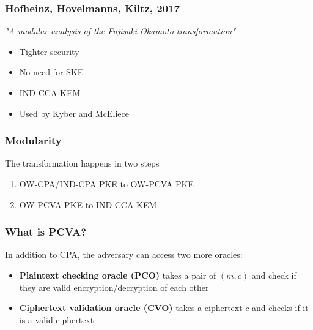 \documentclass{beamer}
\begin{document}
\begin{frame}
    \frametitle{Hofheinz, Hovelmanns, Kiltz, 2017}

    \textit{"A modular analysis of the Fujisaki-Okamoto transformation"}

    \begin{itemize}
        \item Tighter security
        \item No need for SKE
        \item IND-CCA KEM
        \item Used by Kyber and McEliece
    \end{itemize}

\end{frame}

\begin{frame}
    \frametitle{Modularity}

    The transformation happens in two steps

    \begin{enumerate}
        \item OW-CPA/IND-CPA PKE to OW-PCVA PKE
        \item OW-PCVA PKE to IND-CCA KEM
    \end{enumerate}

\end{frame}

\begin{frame}
    \frametitle{What is PCVA?}

    In addition to CPA, the adversary can access two more oracles:

    \begin{itemize}
        \item \textbf{Plaintext checking oracle (PCO)} takes a pair of $(m, c)$ and check if they are valid encryption/decryption of each other
        \item \textbf{Ciphertext validation oracle (CVO)} takes a ciphertext $c$ and checks if it is a valid ciphertext
    \end{itemize}

\end{frame}
\end{document}
